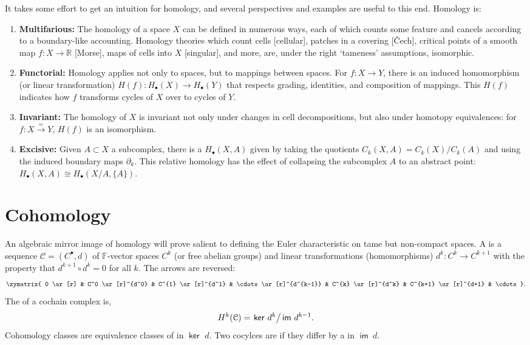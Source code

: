 \documentclass{psapm-l}
\theoremstyle{definition}
\theoremstyle{remark}
\numberwithin{equation}{section}
\begin{document}
It takes some effort to get an intuition for homology, and several perspectives and examples are useful to this end. Homology is:
\begin{enumerate}
\item {\bf Multifarious:} The homology of a space $X$ can be defined in numerous ways, each of which counts some feature and cancels according to a boundary-like accounting. Homology theories which count cells [cellular], patches in a covering [\v{C}ech], critical points of a smooth map $f\colon X\to{{\mathbb R}}$ [Morse], maps of cells into $X$ [singular], and more, are, under the right `tameness' assumptions, isomorphic.
\item {\bf Functorial:} Homology applies not only to spaces, but to mappings between spaces. For $f\colon X\to Y$, there is an induced homomorphism (or linear transformation) $H(f):H_{\bullet}(X)\to H_{\bullet}(Y)$ that respects grading, identities, and composition of mappings. This $H(f)$ indicates how $f$ transforms cycles of $X$ over to cycles of $Y$.
\item {\bf Invariant:} The homology of $X$ is invariant not only under changes in cell decompositions, but also under homotopy equivalences: for $f\colon X\stackrel{\simeq}{\longrightarrow}Y$, $H(f)$ is an isomorphism.
\item {\bf Excisive:} Given $A\subset X$ a subcomplex, there is a {{}} $H_{\bullet}(X,A)$ given by taking the quotients $C_k(X,A)=C_k(X)/C_k(A)$ and using the induced boundary maps ${\partial}_k$. This relative homology has the effect of collapsing the subcomplex $A$ to an abstract point: $H_{\bullet}(X,A)\cong H_{\bullet}(X/A,\{A\})$.
\end{enumerate}

\section{Cohomology}
\label{sec:cohom}

An algebraic mirror image of homology will prove salient to defining the Euler characteristic on tame but non-compact spaces. A {{}} is a sequence ${{\mathcal C}}=(C^{\bullet},d)$ of ${{\mathbb F}}$-vector spaces $C^k$ (or free abelian groups) and linear transformations (homomorphisms) $d^k:C^k\to C^{k+1}$ with the property that $d^{k+1}\circ d^k=0$ for all $k$. The arrows are reversed:
\[
\xymatrix{
0 \ar[r] & C^0 \ar[r]^{d^0} & C^{1} \ar[r]^{d^1} &
\cdots \ar[r]^{d^{k-1}} & C^{k} \ar[r]^{d^k} & C^{k+1} \ar[r]^{d+1} & \cdots
}.
\]
The {{}} of a cochain complex is,
\begin{equation}
    H^k({{\mathcal C}}) = \left.{{{\operatorname{\mathsf{{ker\ }}}}}}  d^k\right/{{{\operatorname{\mathsf{{im}}}}}}\ d^{k-1} .
\end{equation}
Cohomology classes are equivalence classes of {{}} in ${{{\operatorname{\mathsf{{ker\ }}}}}}  d$. Two cocylces are {{}} if they differ by a {{}} in ${{{\operatorname{\mathsf{{im}}}}}}\ d$.
\end{document}
